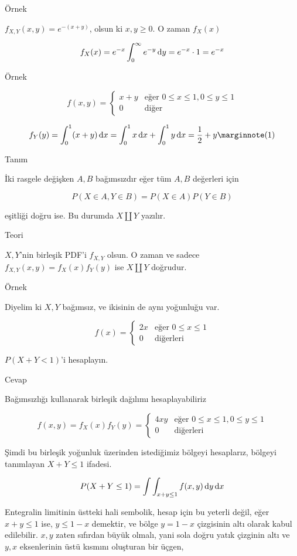 \documentclass[12pt,fleqn]{article}\usepackage{../../common}
\begin{document}
Örnek 

$f_{X,Y}(x,y) = e^{ -(x+y)}$, olsun ki $x,y \ge 0$. O zaman $f_X(x)$

$$
f_X(x) = e^{ -x} \int _{ 0}^{\infty} e^{ -y} \,\mathrm{d} y = e^{ -x}  \cdot 1  = e^{-x} 
$$

Örnek 

$$ f(x,y) = 
\left\{ \begin{array}{ll}
x+y & \textrm{eğer } 0 \le x \le 1, 0 \le y \le 1 \\
0 & \textrm{diğer}
\end{array} \right.
 $$

$$
f_Y(y) = \int _{0}^{1}(x+y) \ud x = 
\int _{0}^{1}x \ud x + \int _{0}^{1}y \ud x  = 
\frac{ 1}{2} + y 
\mlabel{1}
$$

Tanım 

İki rasgele değişken $A,B$ bağımsızdır eğer tüm $A,B$ değerleri için 

$$ P(X \in A, Y \in B) = P(X \in A)P(Y \in B) $$

eşitliği doğru ise. Bu durumda $X \amalg Y$ yazılır.

Teori 

$X,Y$'nin birleşik PDF'i $f_{X,Y}$ olsun. O zaman ve sadece 
$f_{X,Y}(x,y) = f_X(x)f_Y(y)$ ise $X \amalg Y$ doğrudur. 

Örnek 

Diyelim ki $X,Y$ bağımsız, ve ikisinin de aynı yoğunluğu var.

$$ f(x) = 
\left\{ \begin{array}{ll}
2x & \textrm{eğer } 0 \le x \le 1 \\
0 & \textrm{diğerleri}
\end{array} \right.
 $$

$P(X+Y < 1)$'i hesaplayın. 

Cevap

Bağımsızlığı kullanarak birleşik dağılımı hesaplayabiliriz

$$ f(x,y) = f_X(x)f_Y(y) = 
\left\{ \begin{array}{ll}
4xy & \textrm{eğer } 0 \le x \le 1, 0 \le y \le 1 \\
0 & \textrm{diğerleri}
\end{array} \right.
 $$

Şimdi bu birleşik yoğunluk üzerinden istediğimiz bölgeyi hesaplarız,
bölgeyi tanımlayan $X+Y \le 1$ ifadesi. 

$$
P(X+Y \le 1) = \int \int_{x+y \le 1} f(x,y) \,\mathrm{d} y \,\mathrm{d} x
$$

Entegralin limitinin üstteki hali sembolik, hesap için bu yeterli değil, eğer
$x+y \le 1$ ise,  $y \le 1-x$ demektir, ve bölge $y = 1-x$ çizgisinin altı
olarak kabul edilebilir. $x,y$ zaten sıfırdan büyük olmalı, yani sola doğru
yatık çizginin altı ve $y,x$ eksenlerinin üstü kısmını oluşturan bir üçgen,
\end{document}
